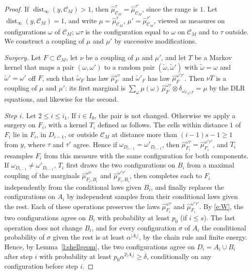\begin{proof}
If $\operatorname{dist}_\infty(y, \mathcal C_M) > 1$, then $\hat\mu^\tau_{\mathcal C_M} = \hat\mu^{\tau'}_{\mathcal C_M}$, since the range is $1$. Let $\operatorname{dist}_\infty(y, \mathcal C_M) = 1$, and write $\mu = \hat\mu^\tau_{\mathcal C_M}$, $\mu' = \hat\mu^{\tau'}_{\mathcal C_M}$, viewed as measures on configurations $\omega$ of $\mathcal C_M$; $\omega\tau$ is the configuration equal to $\omega$ on $\mathcal C_M$ and to $\tau$ outside. We construct a coupling of $\mu$ and $\mu'$ by successive modifications.

\emph{Surgery.} Let $F \subset \mathcal C_M$, let $\nu$ be a coupling of $\mu$ and $\mu'$, and let $T$ be a Markov kernel that maps a pair $(\omega, \omega')$ to a random pair $(\tilde \omega, \tilde \omega')$ with $\tilde \omega = \omega$ and $\tilde \omega' = \omega'$ off $F$, such that $\tilde \omega_F$ has law $\hat\mu^{\omega\tau}_F$ and $\tilde\omega'_F$ has law $\hat\mu^{\omega'\tau'}_F$. Then $\nu T$ is a coupling of $\mu$ and $\mu'$: its first marginal is $\sum_\omega \mu(\omega) \, \hat\mu^{\omega \tau}_F \otimes \delta_{\omega_{\mathcal C_M \setminus F}} = \mu$ by the DLR equations, and likewise for the second.

\emph{Step $i$.} Let $2 \le i \le i_1$. If $i \in I_0$, the pair is not changed. Otherwise we apply a surgery on $F_i$, with a kernel $T_i$ defined as follows. The cells within distance $1$ of $F_i$ lie in $F_i$, in $D_{i - 1}$, or outside $\mathcal C_M$ at distance more than $(i - 1)s - 1 \ge 1$ from $y$, where $\tau$ and $\tau'$ agree. Hence if $\omega_{D_{i - 1}} = \omega'_{D_{i - 1}}$, then $\hat\mu^{\omega\tau}_{F_i} = \hat\mu^{\omega'\tau'}_{F_i}$, and $T_i$ resamples $F_i$ from this measure with the same configuration for both components. If $\omega_{D_{i - 1}} \neq \omega'_{D_{i - 1}}$, $T_i$ first draws the two configurations on $B_i$ from a maximal coupling of the marginals $\hat\mu^{\omega\tau}_{F_i, B_i}$ and $\hat\mu^{\omega'\tau'}_{F_i, B_i}$, then completes each to $F_i$ independently from the conditional laws given $B_i$, and finally replaces the configurations on $A_i$ by independent samples from their conditional laws given the rest. Each of these operations preserves the laws $\hat\mu^{\omega\tau}_{F_i}$ and $\hat\mu^{\omega'\tau'}_{F_i}$. By \eqref{e:W}, the two configurations agree on $B_i$ with probability at least $p_0$ (if $i \le s$). The last operation does not change $B_i$, and for every configuration $\sigma$ of $A_i$ the conditional probability of $\sigma$ given the rest is at least $\alpha^{|A_i|}$, by the chain rule and finite energy. Hence, by Lemma~\ref{l:shellgeom}, the two configurations agree on $D_i = A_i \cup B_i$ after step $i$ with probability at least $p_0 \alpha^{2 |A_i|} \ge \delta$, conditionally on any configuration before step $i$.


\end{proof}
